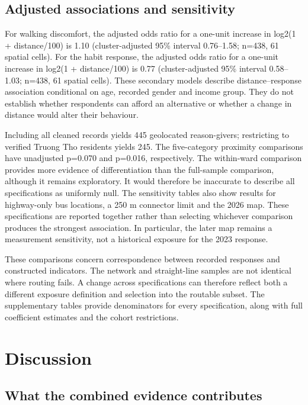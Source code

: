 \documentclass[
  11pt,
  a4paper,
]{article}
\begin{document}
\subsection{Adjusted associations and
sensitivity}\label{adjusted-associations-and-sensitivity}

For walking discomfort, the adjusted odds ratio for a one-unit increase
in log2(1 + distance/100) is 1.10 (cluster-adjusted 95\% interval
0.76--1.58; n=438, 61 spatial cells). For the habit response, the
adjusted odds ratio for a one-unit increase in log2(1 + distance/100) is
0.77 (cluster-adjusted 95\% interval 0.58--1.03; n=438, 61 spatial
cells). These secondary models describe distance--response association
conditional on age, recorded gender and income group. They do not
establish whether respondents can afford an alternative or whether a
change in distance would alter their behaviour.

Including all cleaned records yields 445 geolocated reason-givers;
restricting to verified Truong Tho residents yields 245. The
five-category proximity comparisons have unadjusted p=0.070 and p=0.016,
respectively. The within-ward comparison provides more evidence of
differentiation than the full-sample comparison, although it remains
exploratory. It would therefore be inaccurate to describe all
specifications as uniformly null. The sensitivity tables also show
results for highway-only bus locations, a 250 m connector limit and the
2026 map. These specifications are reported together rather than
selecting whichever comparison produces the strongest association. In
particular, the later map remains a measurement sensitivity, not a
historical exposure for the 2023 response.

These comparisons concern correspondence between recorded responses and
constructed indicators. The network and straight-line samples are not
identical where routing fails. A change across specifications can
therefore reflect both a different exposure definition and selection
into the routable subset. The supplementary tables provide denominators
for every specification, along with full coefficient estimates and the
cohort restrictions.

\section{Discussion}\label{discussion}

\subsection{What the combined evidence
contributes}\label{what-the-combined-evidence-contributes}
\end{document}
